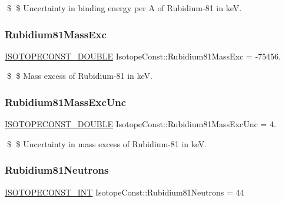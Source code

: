 \$ \$ Uncertainty in binding energy per A of Rubidium-\/81 in keV. \mbox{\label{group___isotope_const-_rubidium-_rb81_ga70a645d9ce0b75cd557d90ddfb868e47}} 
\subsubsection{\texorpdfstring{Rubidium81\+Mass\+Exc}{Rubidium81MassExc}}
{\footnotesize\ttfamily \mbox{\hyperlink{group___isotope_const-_macros_ga8f45a7272ce02c0b4c65c44636ed719a}{I\+S\+O\+T\+O\+P\+E\+C\+O\+N\+S\+T\+\_\+\+D\+O\+U\+B\+LE}} Isotope\+Const\+::\+Rubidium81\+Mass\+Exc = -\/75456.}

\$ \$ Mass excess of Rubidium-\/81 in keV. \mbox{\label{group___isotope_const-_rubidium-_rb81_ga793d0b74df05ac3cf0115f0b5c61121a}} 
\subsubsection{\texorpdfstring{Rubidium81\+Mass\+Exc\+Unc}{Rubidium81MassExcUnc}}
{\footnotesize\ttfamily \mbox{\hyperlink{group___isotope_const-_macros_ga8f45a7272ce02c0b4c65c44636ed719a}{I\+S\+O\+T\+O\+P\+E\+C\+O\+N\+S\+T\+\_\+\+D\+O\+U\+B\+LE}} Isotope\+Const\+::\+Rubidium81\+Mass\+Exc\+Unc = 4.}

\$ \$ Uncertainty in mass excess of Rubidium-\/81 in keV. \mbox{\label{group___isotope_const-_rubidium-_rb81_gab600a29a6f9c3e61149a788937a2e715}} 
\subsubsection{\texorpdfstring{Rubidium81\+Neutrons}{Rubidium81Neutrons}}
{\footnotesize\ttfamily \mbox{\hyperlink{group___isotope_const-_macros_ga5f18360b3e99483a35c32d789e62621c}{I\+S\+O\+T\+O\+P\+E\+C\+O\+N\+S\+T\+\_\+\+I\+NT}} Isotope\+Const\+::\+Rubidium81\+Neutrons = 44}

